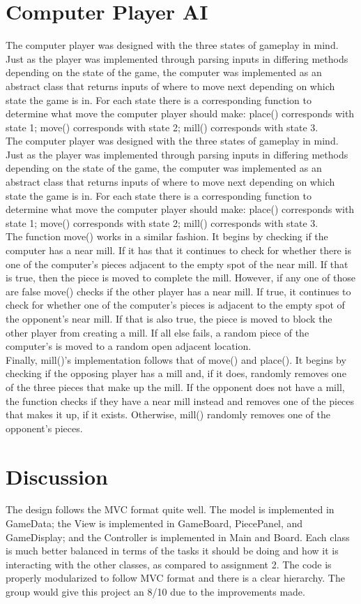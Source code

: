 \documentclass[12pt]{article}
\begin{document}
		\section{Computer Player AI}	
		\indent The computer player was designed with the three states of gameplay in mind. Just as the player was implemented through parsing inputs in differing methods depending on the state of the game, the computer was implemented as an abstract class that returns inputs of where to move next depending on which state the game is in. For each state there is a corresponding function to determine what move the computer player should make: place() corresponds with state 1; move() corresponds with state 2; mill() corresponds with state 3.\\
		The computer player was designed with the three states of gameplay in mind. Just as the player was implemented through parsing inputs in differing methods depending on the state of the game, the computer was implemented as an abstract class that returns inputs of where to move next depending on which state the game is in. For each state there is a corresponding function to determine what move the computer player should make: place() corresponds with state 1; move() corresponds with state 2; mill() corresponds with state 3.\\
		The function move() works in a similar fashion. It begins by checking if the computer has a near mill. If it has that it continues to check for whether there is one of the computer’s pieces adjacent to the empty spot of the near mill. If that is true, then the piece is moved to complete the mill. However, if any one of those are false move() checks if the other player has a near mill. If true, it continues to check for whether one of the computer’s pieces is adjacent to the empty spot of the opponent’s near mill. If that is also true, the piece is moved to block the other player from creating a mill. If all else fails, a random piece of the computer’s is moved to a random open adjacent location.\\
		Finally, mill()’s implementation follows that of move() and place(). It begins by checking if the opposing player has a mill and, if it does, randomly removes one of the three pieces that make up the mill. If the opponent does not have a mill, the function checks if they have a near mill instead and removes one of the pieces that makes it up, if it exists. Otherwise, mill() randomly removes one of the opponent’s pieces.\\		
	\section{Discussion}
	The design follows the MVC format quite well. The model is implemented in GameData; the View is implemented in GameBoard, PiecePanel, and GameDisplay; and the Controller is implemented in Main and Board. Each class is much better balanced in terms of the tasks it should be doing and how it is interacting with the other classes, as compared to assignment 2. The code is properly modularized to follow MVC format and there is a clear hierarchy. The group would give this project an 8/10 due to the improvements made.
	
\end{document}
